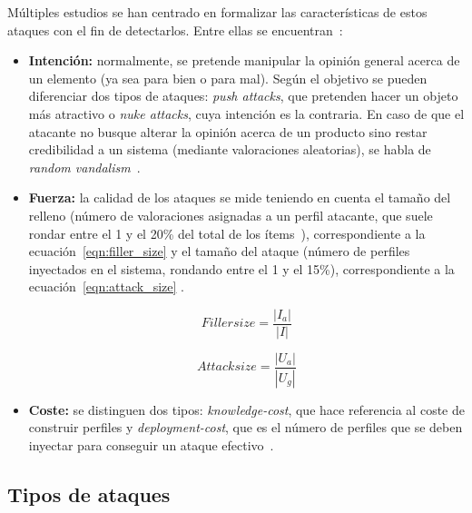 Múltiples estudios se han centrado en formalizar las características de estos ataques con el fin de detectarlos. Entre ellas se encuentran~\cite{mingdan2018ShillingAttacksAReview}:

\begin{itemize}
	
	\item \textbf{Intención:} normalmente, se pretende manipular la opinión general acerca de un elemento (ya sea para bien o para mal). Según el objetivo se pueden diferenciar dos tipos de ataques: \textit{push attacks}, que pretenden hacer un objeto más atractivo o \textit{nuke attacks}, cuya intención es la contraria. En caso de que el atacante no busque alterar la opinión acerca de un producto sino restar credibilidad a un sistema (mediante valoraciones aleatorias), se habla de \textit{random vandalism}~\cite{Burke2015RobustCollaborative}.
	
	\item \textbf{Fuerza:} la calidad de los ataques se mide teniendo en cuenta el tamaño del relleno (número de valoraciones asignadas a un perfil atacante, que suele rondar entre el 1 y el 20\% del total de los ítems~\cite{mingdan2018ShillingAttacksAReview}), correspondiente a la ecuación~\ref{eqn:filler_size}  y el tamaño del ataque (número de perfiles inyectados en el sistema, rondando entre el 1 y el 15\%), correspondiente a la ecuación~\ref{eqn:attack_size} .
	
	\begin{equation}\label{eqn:filler_size} Filler size = \frac{|I_a|}{|I|}\end{equation}
	
	\begin{equation}\label{eqn:attack_size} Attack size = \frac{|U_a|}{|U_g|}\end{equation}
	
	\item \textbf{Coste:} se distinguen dos tipos: \textit{knowledge-cost}, que hace referencia al coste de construir perfiles y \textit{deployment-cost}, que es el número de perfiles que se deben inyectar para conseguir un ataque efectivo~\cite{Mobasher2006Thesis}.
	
\end{itemize}

\subsection{Tipos de ataques}
\label{sec:tipos_ataques_recomendacion}

